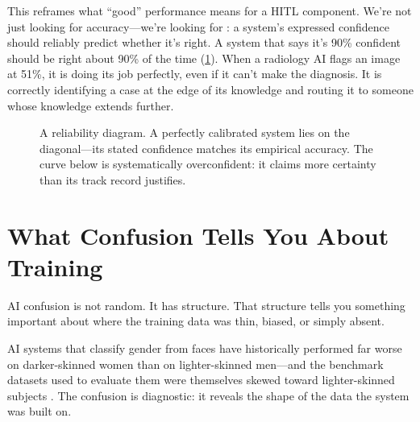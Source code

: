 This reframes what ``good'' performance means for a HITL component. We're not just looking for accuracy---we're looking for : a system's expressed confidence should reliably predict whether it's right. A system that says it's 90\% confident should be right about 90\% of the time (\cref{fig:reliability}). When a radiology AI flags an image at 51\%, it is doing its job perfectly, even if it can't make the diagnosis. It is correctly identifying a case at the edge of its knowledge and routing it to someone whose knowledge extends further.

\begin{figure}[htbp]
\centering
{}
\caption{A reliability diagram. A perfectly calibrated system lies on the diagonal---its stated confidence matches its empirical accuracy. The curve below is systematically overconfident: it claims more certainty than its track record justifies.}
\label{fig:reliability}
\end{figure}

\section{What Confusion Tells You About Training}

AI confusion is not random. It has structure. That structure tells you something important about where the training data was thin, biased, or simply absent.

AI systems that classify gender from faces have historically performed far worse on darker-skinned women than on lighter-skinned men---and the benchmark datasets used to evaluate them were themselves skewed toward lighter-skinned subjects \autocite{buolamwini2018gender}. The confusion is diagnostic: it reveals the shape of the data the system was built on.


